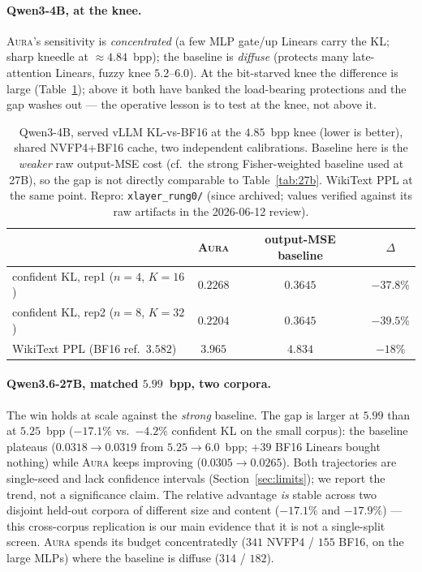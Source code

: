 \documentclass[11pt]{article}
\theoremstyle{plain}
\theoremstyle{definition}
\begin{document}
\paragraph{Qwen3-4B, at the knee.} \textsc{Aura}'s sensitivity is
\emph{concentrated} (a few MLP gate/up Linears carry the KL; sharp kneedle at
$\approx4.84$~bpp); the baseline is \emph{diffuse} (protects many late-attention
Linears, fuzzy knee $5.2$--$6.0$). At the bit-starved knee the difference is
large (Table~\ref{tab:4b}); above it both have banked the load-bearing
protections and the gap washes out --- the operative lesson is to test at the
knee, not above it.

\begin{table}[t]\centering
\small
\caption{Qwen3-4B, served vLLM KL-vs-BF16 at the $4.85$~bpp knee (lower is
better), shared NVFP4+BF16 cache, two independent calibrations. Baseline here is
the \emph{weaker} raw output-MSE cost (cf.\ the strong Fisher-weighted baseline
used at 27B), so the gap is not directly comparable to Table~\ref{tab:27b}.
WikiText PPL at the same point. Repro: \texttt{xlayer\_rung0/} (since archived;
values verified against its raw artifacts in the 2026-06-12 review).}
\label{tab:4b}
\begin{tabular}{lccc}
\toprule
 & \textsc{Aura} & output-MSE baseline & $\Delta$ \\
\midrule
confident KL, rep1 ($n{=}4$, $K{=}16$) & $0.2268$ & $0.3645$ & $-37.8\%$ \\
confident KL, rep2 ($n{=}8$, $K{=}32$) & $0.2204$ & $0.3645$ & $-39.5\%$ \\
WikiText PPL (BF16 ref.\ $3.582$)      & $3.965$  & $4.834$  & $-18\%$ \\
\bottomrule
\end{tabular}
\end{table}

\paragraph{Qwen3.6-27B, matched $5.99$~bpp, two corpora.} The win holds at scale
against the \emph{strong} baseline. The gap is larger at $5.99$ than at $5.25$~bpp
($-17.1\%$ vs.\ $-4.2\%$ confident KL on the small corpus): the baseline plateaus
($0.0318\!\to\!0.0319$ from $5.25\!\to\!6.0$~bpp; $+39$ BF16 Linears bought
nothing) while \textsc{Aura} keeps improving ($0.0305\!\to\!0.0265$). Both
trajectories are single-seed and lack confidence intervals
(Section~\ref{sec:limits}); we report the trend, not a significance claim. The
relative advantage \emph{is} stable across two disjoint held-out corpora of
different size and content ($-17.1\%$ and $-17.9\%$) --- this cross-corpus
replication is our main evidence that it is not a single-split screen.
\textsc{Aura} spends its budget concentratedly ($341$ NVFP4 / $155$ BF16, on the
large MLPs) where the baseline is diffuse ($314$ / $182$).
\end{document}
